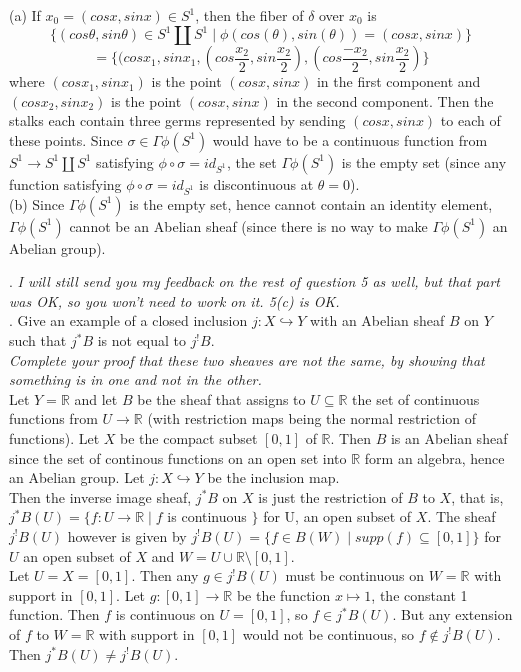 (a) If $x_0 = (cosx,sinx) \in S^1$, then the fiber of $\delta$ over $x_0$ is \[\{(cos\theta, sin\theta) \in  S^1 \coprod S^1  \mid \phi(cos(\theta), sin(\theta))=(cosx, sinx)\}\]
\[ = \{(cosx_1, sinx_1, (cos\frac{x_2}{2}, sin\frac{x_2}{2}), (cos\frac{-x_2}{2}, sin\frac{x_2}{2})\}\]
where $(cosx_1, sinx_1)$ is the point $(cosx,sinx)$ in the first component and $(cosx_2,sinx_2)$ is the point $(cosx,sinx)$ in the second component. Then the stalks each contain three germs represented by sending $(cosx, sinx)$ to each of these points. 
Since $\sigma \in \Gamma \phi(S^1)$ would have to be a continuous function from $S^1 \rightarrow S^1 \coprod S^1$ satisfying $\phi \circ \sigma = id_{S^1}$, the set $\Gamma \phi (S^1)$ is the empty set (since any function satisfying $\phi \circ \sigma = id_{S^1}$ is discontinuous at $\theta = 0$).\\

(b) Since $\Gamma \phi (S^1)$ is the empty set, hence cannot contain an identity element, $\Gamma \phi (S^1)$ cannot be an Abelian sheaf (since there is no way to make $\Gamma \phi (S^1)$ an Abelian group).

. \textit{I will still send you my feedback on the rest of question 5 as well, but that part was OK, so you won't need to work on it. 5(c) is OK.}\\
. Give an example of a closed inclusion $j: X \hookrightarrow Y$ with an Abelian sheaf $B$ on $Y$ such that $j^*B$ is not equal to $j^!B$.\\

\textit{Complete your proof that these two sheaves are not the same, by showing that something is in one and not in the other.}\\

Let $Y=\mathbb{R}$ and let $B$ be the sheaf that assigns to $U \subseteq \mathbb{R}$ the set of continuous functions from $U \rightarrow \mathbb{R}$ (with restriction maps being the normal restriction of functions). Let $X$ be the compact subset $[0,1]$ of $\mathbb{R}$. Then $B$ is an Abelian sheaf since the set of continous functions on an open set into $\mathbb{R}$ form an algebra, hence an Abelian group. Let $j:X \hookrightarrow Y$ be the inclusion map. \\

Then the inverse image sheaf, $j^*B$ on $X$ is just the restriction of $B$ to $X$, that is, $j^*B(U) = \{f:U \rightarrow \mathbb{R} \mid f$ is continuous $\}$ for U, an open subset of $X$. The sheaf $j^!B(U)$ however is given by $j^!B(U) =\{f \in B(W) \mid supp(f) \subseteq [0,1] \}$ for $U$ an open subset of $X$ and $W=U \cup \mathbb{R} \setminus [0,1]$.\\

Let $U = X =[0,1]$. Then any $g \in j^!B(U)$ must be continuous on $W = \mathbb{R}$ with support in $[0,1]$. Let $g: [0,1] \rightarrow \mathbb{R}$ be the function $x \mapsto 1$, the constant 1 function. Then $f$ is continuous on $U = [0,1]$, so $f \in j^*B(U)$. But any extension of $f$ to $W = \mathbb{R}$ with support in $[0,1]$ would not be continuous, so $f \notin j^!B(U)$. Then $ j^*B(U) \neq  j^!B(U)$.